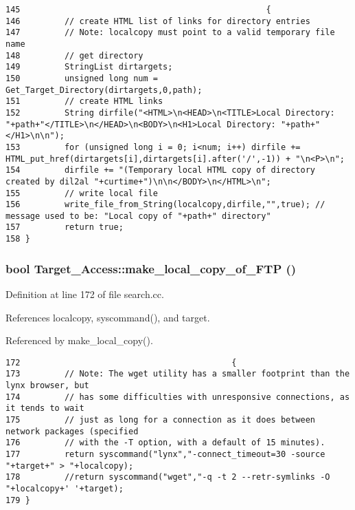 \footnotesize\begin{verbatim}145                                                  {
146         // create HTML list of links for directory entries
147         // Note: localcopy must point to a valid temporary file name
148         // get directory
149         StringList dirtargets;
150         unsigned long num = Get_Target_Directory(dirtargets,0,path);
151         // create HTML links
152         String dirfile("<HTML>\n<HEAD>\n<TITLE>Local Directory: "+path+"</TITLE>\n</HEAD>\n<BODY>\n<H1>Local Directory: "+path+"</H1>\n\n");
153         for (unsigned long i = 0; i<num; i++) dirfile += HTML_put_href(dirtargets[i],dirtargets[i].after('/',-1)) + "\n<P>\n";
154         dirfile += "(Temporary local HTML copy of directory created by dil2al "+curtime+")\n\n</BODY>\n</HTML>\n";
155         // write local file
156         write_file_from_String(localcopy,dirfile,"",true); // message used to be: "Local copy of "+path+" directory"
157         return true;
158 }
\end{verbatim}\normalsize 
{}
\subsubsection{\setlength{\rightskip}{0pt plus 5cm}bool Target\_\-Access::make\_\-local\_\-copy\_\-of\_\-FTP ()\hspace{0.3cm}{\tt  [protected]}}\label{classTarget__Access_b7}




Definition at line 172 of file search.cc.

References localcopy, syscommand(), and target.

Referenced by make\_\-local\_\-copy().



\footnotesize\begin{verbatim}172                                           {
173         // Note: The wget utility has a smaller footprint than the lynx browser, but
174         // has some difficulties with unresponsive connections, as it tends to wait
175         // just as long for a connection as it does between network packages (specified
176         // with the -T option, with a default of 15 minutes).
177         return syscommand("lynx","-connect_timeout=30 -source "+target+" > "+localcopy);
178         //return syscommand("wget","-q -t 2 --retr-symlinks -O "+localcopy+' '+target);
179 }
\end{verbatim}\normalsize 
{}
